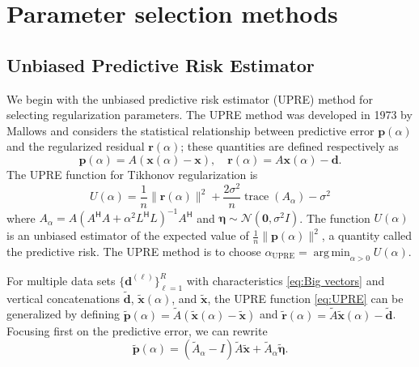 \documentclass[12pt]{article}
\newcommand{\dVec}{\mathbf{d}}	%
\newcommand{\pVec}{\mathbf{p}}	%
\newcommand{\rVec}{\mathbf{r}}	%
\newcommand{\xVec}{\mathbf{x}}	%
\newcommand{\ctrans}[1]{{#1}^\mathsf{H}}	%
\DeclareMathOperator{\trace}{trace}		%
\newcommand{\regparam}{\alpha}
\newcommand{\xReg}{\xVec(\regparam)}	%
\newcommand{\xSol}{\xVec}	%
\DeclareMathOperator*{\argmin}{arg\,min}
\newcommand{\noise}{\eta}	%
\newcommand{\noiseSD}{\sigma}	%
\newcommand{\noiseVec}{\bm{\noise}}	%
\newcommand{\A}{A_{\regparam}}	%
\newcommand{\U}{U}	%
\begin{document}
\section{Parameter selection methods} \label{sec:Methods}


\subsection{Unbiased Predictive Risk Estimator} \label{sec:UPRE}
We begin with the unbiased predictive risk estimator (UPRE) method for selecting regularization parameters. The UPRE method was developed in 1973 by Mallows \cite{Mallows1973} and considers the statistical relationship between predictive error $\pVec(\regparam)$ and the regularized residual $\rVec(\regparam)$; these quantities are defined respectively as
\begin{equation}
\label{eq:Predictive Error and Regularized Residual}
\pVec(\regparam) = A(\xReg - \xSol), \quad \rVec(\regparam) = A\xReg - \dVec.
\end{equation}
The UPRE function for Tikhonov regularization is
\begin{equation}
\label{eq:UPRE}
\U(\alpha) = \frac{1}{n}\|\rVec(\regparam)\|^2 + \frac{2\noiseSD^2}{n}\trace(A_\regparam) - \noiseSD^2
\end{equation}
where $\A = A(\ctrans{A}A + \regparam^2\ctrans{L}L)^{-1}\ctrans{A}$ and $\noiseVec \sim \mathcal{N}(\bm{0},\noiseSD^2I)$. The function $\U(\regparam)$ is an unbiased estimator of the expected value of $\frac{1}{n}\|\pVec(\regparam)\|^2$, a quantity called the predictive risk. The UPRE method is to choose $\regparam_{\textrm{UPRE}} = \argmin_{\regparam > 0} \U(\regparam)$. \par
For multiple data sets $\{\dVec^{(\ell)}\}_{\ell=1}^R$ with characteristics \eqref{eq:Big vectors} and vertical concatenations $\widetilde{\dVec}$, $\widetilde{\xVec}(\regparam)$, and $\widetilde{\xVec}$, the UPRE function \eqref{eq:UPRE} can be generalized by defining $\widetilde{\pVec}(\regparam) = \widetilde{A}\left(\widetilde{\xVec}(\regparam) - \widetilde{\xVec}\right)$ and $\widetilde{\rVec}(\regparam) = \widetilde{A}\widetilde{\xVec}(\regparam) - \widetilde{\dVec}$. Focusing first on the predictive error, we can rewrite 
\begin{equation}
\label{eq:New Predictive Error}
\widetilde{\pVec}(\regparam) = \left(\widetilde{A}_\regparam - I\right)\widetilde{A}\widetilde{\xVec} + \widetilde{A}_\regparam\widetilde{\noiseVec}.
\end{equation}
\end{document}
